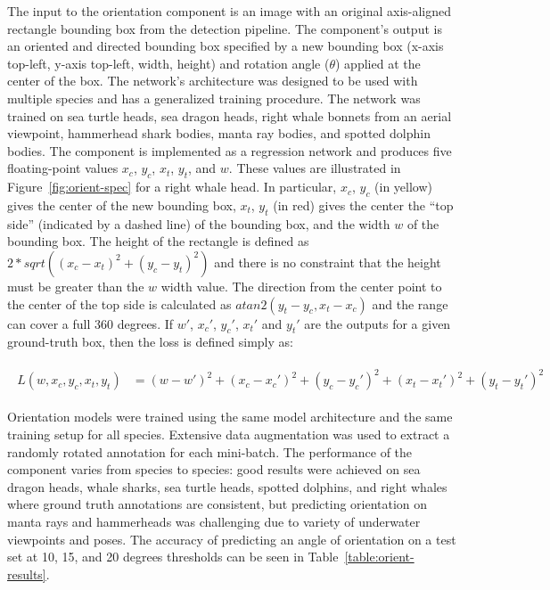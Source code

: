 The input to the orientation component is an image with an original axis-aligned rectangle bounding box from the detection pipeline.  The component's output is an oriented and directed bounding box specified by a new bounding box (x-axis top-left, y-axis top-left, width, height) and rotation angle ($\theta$) applied at the center of the box.  The network's architecture was designed to be used with multiple species and has a generalized training procedure.  The network was trained on sea turtle heads, sea dragon heads, right whale bonnets from an aerial viewpoint, hammerhead shark bodies, manta ray bodies, and spotted dolphin bodies.  The component is implemented as a regression network and produces five floating-point values $x_c$, $y_c$, $x_t$, $y_t$, and $w$.  These values are illustrated in Figure~\ref{fig:orient-spec} for a right whale head.  In particular, $x_c$, $y_c$ (in yellow) gives the center of the new bounding box, $x_t$, $y_t$ (in red) gives the center the ``top side'' (indicated by a dashed line) of the bounding box, and the width $w$ of the bounding box.  The height of the rectangle is defined as $2*sqrt((x_c-x_t)^2 + (y_c-y_t)^2)$ and there is no constraint that the height must be greater than the $w$ width value.  The direction from the center point to the center of the top side is calculated as $atan2(y_t-y_c, x_t-x_c)$ and the range can cover a full 360 degrees.  If $w'$, $x_c'$, $y_c'$, $x_t'$ and $y_t'$ are the outputs for a given ground-truth box, then the loss is defined simply as:

\begin{align}
    \begin{split}
        L(w, x_c, y_c, x_t, y_t) &= (w-w')^2 + (x_c-x_c')^2  + (y_c-y_c')^2 + (x_t-x_t')^2 +(y_t-y_t')^2
    \end{split}
\end{align}

\noindent Orientation models were trained using the same model architecture and the same training setup for all species.  Extensive data augmentation was used to extract a randomly rotated annotation for each mini-batch.  The performance of the component varies from species to species: good results were achieved on sea dragon heads, whale sharks, sea turtle heads, spotted dolphins, and right whales where ground truth annotations are consistent, but predicting orientation on manta rays and hammerheads was challenging due to variety of underwater viewpoints and poses.  The accuracy of predicting an angle of orientation on a test set at 10, 15, and 20 degrees thresholds can be seen in Table~\ref{table:orient-results}.

